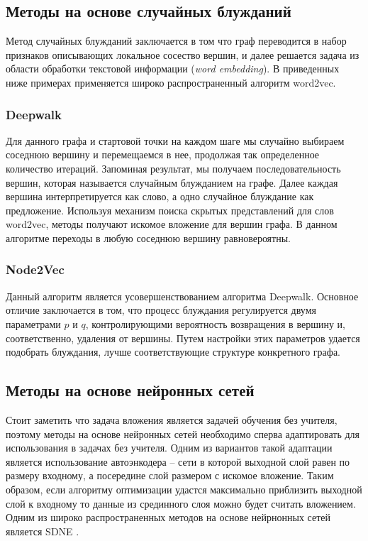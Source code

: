 \documentclass[12pt,a4paper]{extarticle}
\begin{document}
    \subsection{Методы на основе случайных блужданий}
    Метод случайных блужданий заключается в том что граф переводится в набор признаков описывающих локальное сосество вершин, и далее решается задача из области обработки текстовой информации (\textit{word embedding}). В приведенных ниже примерах применяется широко распространенный алгоритм word2vec.
    
    \subsubsection{Deepwalk \cite{deepwalk}}
    Для данного графа и стартовой точки на каждом шаге мы случайно выбираем соседнюю вершину и перемещаемся в нее, продолжая так определенное количество итераций.
    Запоминая результат, мы получаем последовательность вершин, которая называется случайным блужданием на графе.
    Далее каждая вершина интерпретируется как слово, а одно случайное блуждание как предложение.
    Используя механизм поиска скрытых представлений для слов word2vec, методы получают искомое вложение для вершин графа.
    В данном алгоритме переходы в любую соседнюю вершину равновероятны.
    
    \subsubsection{Node2Vec \cite{node2vec}}
    Данный алгоритм является усовершенствованием алгоритма
    Deepwalk.
    Основное отличие заключается в том, что процесс блуждания регулируется двумя параметрами $p$ и $q$, контролирующими вероятность возвращения в вершину и, соответственно, удаления от вершины.
    Путем настройки этих параметров удается подобрать блуждания, лучше соответствующие структуре конкретного графа.
    
    \subsection{Методы на основе нейронных сетей}
    Стоит заметить что задача вложения является задачей обучения без учителя, поэтому методы на основе нейронных сетей необходимо сперва адаптировать для использования в задачах без учителя.
    Одним из вариантов такой адаптации является использование автоэнкодера -- сети в которой выходной слой равен по размеру входному, а посередине слой размером с искомое вложение.
    Таким образом, если алгоритму оптимизации удастся максимально приблизить выходной слой к входному то данные из срединного слоя можно будет считать вложением.
    Одним из широко распространенных методов на основе нейрнонных сетей является SDNE \cite{sdne}.
    
\end{document}
